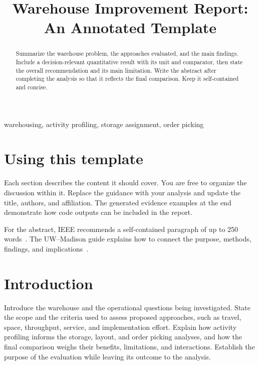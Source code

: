 \documentclass[conference]{IEEEtran}
\begin{document}
\pagestyle{plain}
\raggedbottom

\title{Warehouse Improvement Report: An Annotated Template}

\author{
}

\maketitle
\thispagestyle{plain}


\begin{abstract}
Summarize the warehouse problem, the approaches evaluated, and the main
findings. Include a decision-relevant quantitative result with its unit and
comparator, then state the overall recommendation and its main limitation.
Write the abstract after completing the analysis so that it reflects the
final comparison. Keep it self-contained and concise.
\end{abstract}

\begin{IEEEkeywords}
warehousing, activity profiling, storage assignment, order picking
\end{IEEEkeywords}

\section*{Using this template}
Each section describes the content it should cover. You are free to organize
the discussion within it. Replace the guidance with your analysis and update
the title, authors, and affiliation. The generated evidence examples at the
end demonstrate how code outputs can be included in the report.

For the abstract, IEEE recommends a self-contained paragraph of up to
250 words~\cite{ieee-structure}. The UW--Madison guide explains how to connect
the purpose, methods, findings, and implications~\cite{uw-abstract}.

\section{Introduction}
Introduce the warehouse and the operational questions being investigated.
State the scope and the criteria used to assess proposed approaches, such as
travel, space, throughput, service, and implementation effort. Explain how
activity profiling informs the storage, layout, and order picking analyses,
and how the final comparison weighs their benefits, limitations, and
interactions. Establish the purpose of the evaluation while leaving its
outcome to the analysis.
\end{document}

